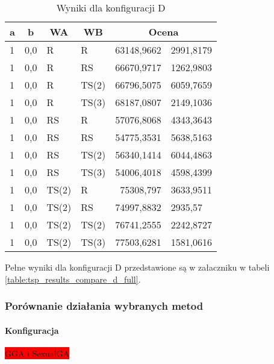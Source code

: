 \documentclass[twoside]{iisthesis}
\newcommand{\todo}{\colorbox{red}}
\begin{document}
\begin{table}[h]
	\caption{Wyniki dla konfiguracji D \label{table:tsp_results_compare_d}}
	\centering
	\begin{tabular}{|l|l|l|l|r@{$\pm$}l|}
		\hline
		\multicolumn{1}{|c|}{{\bf a}} & \multicolumn{1}{|c|}{{\bf b}} & \multicolumn{1}{|c|}{{\bf WA}} & \multicolumn{1}{c|}{{\bf WB}} & \multicolumn{2}{c|}{{\bf Ocena}} \\ \hline \hline
			1 & 0,0 & R & R & 63148,9662 & 2991,8179 \\ \hline
			1 & 0,0 & R & RS & 66670,9717 & 1262,9803 \\ \hline
			1 & 0,0 & R & TS(2) & 66796,5075 & 6059,7659 \\ \hline
			1 & 0,0 & R & TS(3) & 68187,0807 & 2149,1036 \\ \hline
			1 & 0,0 & RS & R & 57076,8068 & 4343,3643 \\ \hline
			1 & 0,0 & RS & RS & 54775,3531 & 5638,5163 \\ \hline
			1 & 0,0 & RS & TS(2) & 56340,1414 & 6044,4863 \\ \hline
			1 & 0,0 & RS & TS(3) & 54006,4018 & 4598,4399 \\ \hline
			1 & 0,0 & TS(2) & R & 75308,797 & 3633,9511 \\ \hline
			1 & 0,0 & TS(2) & RS & 74997,8832 & 2935,57 \\ \hline
			1 & 0,0 & TS(2) & TS(2) & 76741,2555 & 2242,8727 \\ \hline
			1 & 0,0 & TS(2) & TS(3) & 77503,6281 & 1581,0616 \\ \hline
	\end{tabular}
	
\end{table}

Pełne wyniki dla konfiguracji D przedstawione są w załaczniku w tabeli \ref{table:tsp_results_compare_d_full}.

\subsubsection{Porównanie działania wybranych metod}

\paragraph{Konfiguracja}

\todo{GGA i SexualGA}
\end{document}
